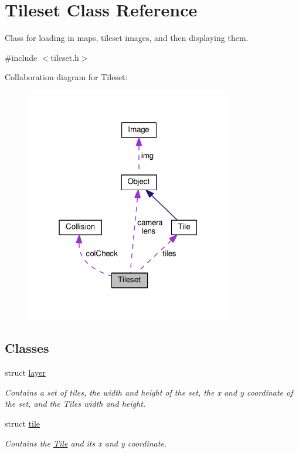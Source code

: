 \hypertarget{classTileset}{}\section{Tileset Class Reference}
\label{classTileset}


Class for loading in maps, tileset images, and then displaying them.  




{\ttfamily \#include $<$tileset.\+h$>$}



Collaboration diagram for Tileset\+:\nopagebreak
\begin{figure}[H]
\begin{center}
\leavevmode
\includegraphics[width=256pt]{classTileset__coll__graph}
\end{center}
\end{figure}
\subsection*{Classes}
\begin{DoxyCompactItemize}
\item 
struct \hyperlink{structTileset_1_1layer}{layer}
\begin{DoxyCompactList}\small\item\em Contains a set of tiles, the width and height of the set, the x and y coordinate of the set, and the Tiles width and height. \end{DoxyCompactList}\item 
struct \hyperlink{structTileset_1_1tile}{tile}
\begin{DoxyCompactList}\small\item\em Contains the \hyperlink{classTile}{Tile} and its x and y coordinate. \end{DoxyCompactList}\end{DoxyCompactItemize}
